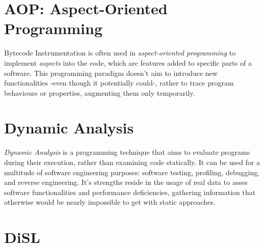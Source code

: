\documentclass[]{usiinfthesis}
\begin{document}
\section{AOP: Aspect-Oriented Programming}
Bytecode Instrumentation is often used in \textit{aspect-oriented programming} to implement \textit{aspects} into the code, which are features added to specific parts of a software. This programming paradigm doesn't aim to introduce new functionalities -even though it potentially could-, rather to trace program behaviours or properties, augmenting them only temporarily.


\section{Dynamic Analysis}
\textit{Dynamic Analysis} is a programming technique that aims to evaluate programs during their execution, rather than examining code statically. It can be used for a multitude of software engineering purposes: software testing, profiling, debugging, and reverse engineering. It's strengths reside in the usage of real data to asses software functionalities and performance deficiencies, gathering information that otherwise would be nearly impossible to get with static approaches. 

\section{DiSL}
\end{document}

